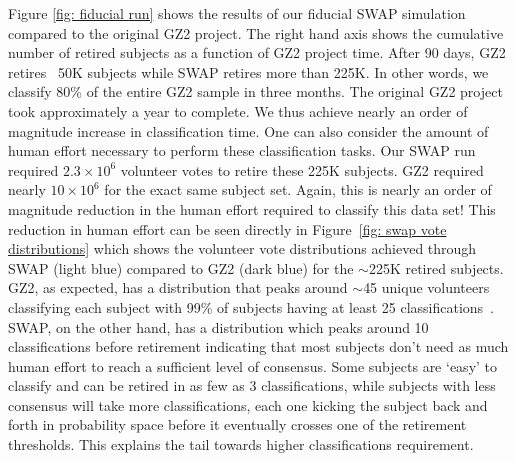 \documentclass[twocolumn]{aastex6}
\begin{document}
Figure \ref{fig: fiducial run} shows the results of our fiducial SWAP simulation
compared to the original GZ2 project. The right hand  axis shows the cumulative
number of retired subjects as a function of GZ2 project time. After 90 days, GZ2 
retires ~50K subjects while SWAP retires more than 225K. In other words, we classify 80\% of
the entire GZ2 sample in three months. The original GZ2 project took approximately
a year to complete. We thus achieve nearly an order of magnitude increase in
classification time. One can also consider the amount of human effort necessary to 
perform these classification tasks. Our SWAP run required $2.3 \times 10^6$ volunteer
votes to retire these 225K subjects. GZ2 required nearly $10 \times 10^6$ for the 
exact same subject set. Again, this is nearly an order of magnitude reduction in 
the human effort required to classify this data set! This reduction in human effort 
can be seen directly in Figure~\ref{fig: swap vote distributions} which shows the volunteer 
vote distributions achieved through SWAP (light blue) compared to GZ2 (dark blue)
for the $\sim$225K retired subjects. GZ2, as expected, has a distribution that peaks 
around $\sim$45 unique volunteers classifying each subject with 99\% of subjects 
having at least 25 classifications~\citep{Willett2013}. 
SWAP, on the other hand, has a distribution which peaks around 10 classifications
before retirement indicating that most subjects don't need as much human effort
to reach a sufficient level of consensus. Some subjects are `easy' to classify and can be 
retired in as few as 3 classifications, while subjects with less consensus will 
take more classifications, each one kicking the subject back and forth in probability space
before it eventually crosses one of the retirement thresholds. 
This explains the tail towards higher classifications requirement.
\end{document}
